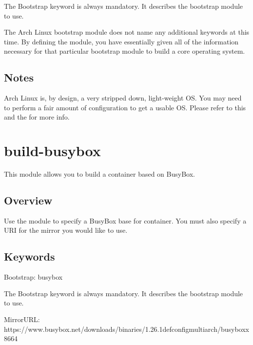 \documentclass[letterpaper,10pt,english]{sphinxmanual}
\begin{document}
The Bootstrap keyword is always mandatory. It describes the bootstrap module to use.

The Arch Linux bootstrap module does not name any additional keywords at this time. By defining the  module, you have essentially given all of the
information necessary for that particular bootstrap module to build a core operating system.


\subsection{Notes}
\label{\detokenize{appendix:id21}}
Arch Linux is, by design, a very stripped down, light-weight OS. You may need to perform a fair amount of configuration to get a usable OS. Please refer
to this  and
the  for more info.


\section{build-busybox}
\label{\detokenize{appendix:build-busybox}}\label{\detokenize{appendix:id22}}\label{\detokenize{appendix:sec-build-busybox}}
This module allows you to build a container based on BusyBox.


\subsection{Overview}
\label{\detokenize{appendix:id23}}
Use the  module to specify a BusyBox base for container. You must also specify a URI for the mirror you would like to use.


\subsection{Keywords}
\label{\detokenize{appendix:id24}}
%
\begin{sphinxVerbatim}[commandchars=\\\{\}]
Bootstrap: busybox
\end{sphinxVerbatim}

The Bootstrap keyword is always mandatory. It describes the bootstrap module to use.

%
\begin{sphinxVerbatim}[commandchars=\\\{\}]
MirrorURL: https://www.busybox.net/downloads/binaries/1.26.1\PYGZhy{}defconfig\PYGZhy{}multiarch/busybox\PYGZhy{}x86\PYGZus{}64
\end{sphinxVerbatim}
\end{document}
